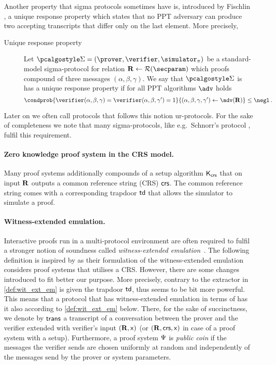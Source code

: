 \documentclass[runningheads]{llncs}
\theoremstyle{definition}
\begin{document}
Another property that sigma protocols sometimes have is, introduced by Fischlin \cite{C:Fischlin05}, a unique response property which states that no PPT adversary  can produce two accepting transcripts that differ only on the last element. 
More precisely, 
\begin{description}
	\item[Unique response property] Let $\sigmaprot = (\prover, \verifier, \simulator_\zkproof)$ be a standard-model sigma-protocol for relation $\REL \gets \RELGEN(\secparam)$ which proofs compound of three messages $(\alpha, \beta, \gamma)$. We say that $\sigmaprot$ is has a unique response property if for all PPT algorithms $\adv$ holds
	\[
	\condprob{\verifier (\alpha, \beta, \gamma) = \verifier (\alpha, \beta, \gamma')  = 1}{(\alpha, \beta, \gamma, \gamma') \gets \adv(\REL)} \leq \negl\,.
	\]
\end{description}
Later on we often call protocols that follows this notion ur-protocols.
For the sake of completeness we note that many sigma-protocols, like e.g.~Schnorr's protocol \cite{C:Schnorr89}, fulfil this requirement.

\paragraph{Zero knowledge proof system in the CRS model.}
Many proof systems additionally compounds of a setup algorithm $\mathsf{K}_{\mathsf{crs}}$ that on input $\mathbf{R}$ outputs a common reference string (CRS) $\mathsf{crs}$. The common reference string comes with a corresponding trapdoor $\mathsf{td}$ that allows the simulator to simulate a proof. 

\paragraph{Witness-extended emulation.}
Interactive proofs run in a multi-protocol environment are often required to fulfil a stronger notion of soundness called \emph{witness-extended emulation}~\cite{JC:Lindell03}. 
The following definition is inspired by  \cite{EC:GroIsh08} as their formulation of the witness-extended emulation considers proof systems that utilises a CRS. However, there are some changes introduced to fit better our purpose. More precisely, contrary to \cite{EC:GroIsh08,EC:BCCGP16} the extractor in \cref{def:wit_ext_em} is given the trapdoor $\mathsf{td}$, thus seems to be bit more powerful. 
This means that a protocol that has witness-extended emulation in terms of \cite{EC:GroIsh08} has it also according to \cref{def:wit_ext_em} below. 
There, for the sake of succinctness, we denote by $\mathsf{trans}$ a transcript of a conversation between the prover and the verifier extended with verifier's input $(\mathbf{R}, \mathsf{x})$ (or $(\mathbf{R}, \mathsf{crs}, \mathsf{x})$ in case of a proof system with a setup).
Furthermore, a proof system $\mathrm{\Psi}$ is \emph{public coin} if the messages the verifier sends are chosen uniformly at random and independently of the messages send by the prover or system parameters.
\end{document}

